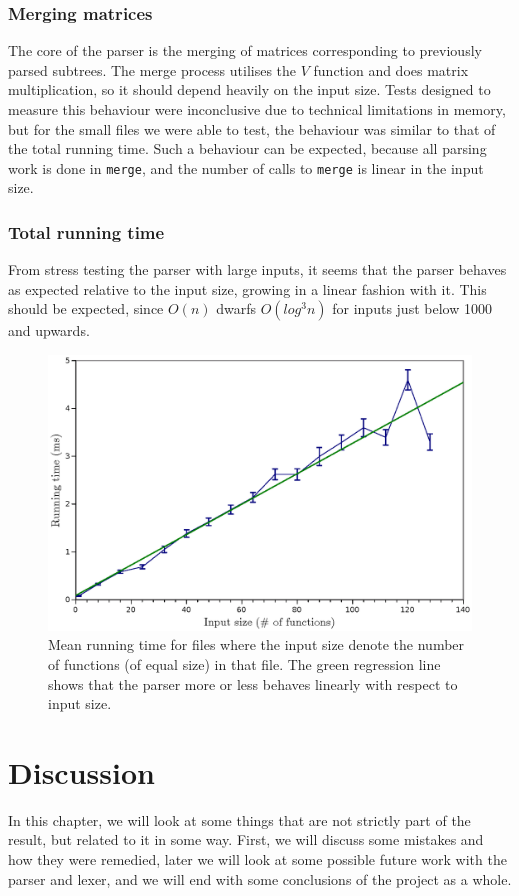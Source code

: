 \documentclass[a4paper,12pt,notitlepage]{report}
\begin{document}
\subsection{Merging matrices}
The core of the parser is the merging of matrices corresponding to previously
parsed subtrees. The merge process utilises the $V$ function and does matrix 
multiplication, so it should depend heavily on the input size. Tests designed to
measure this behaviour were inconclusive due to technical limitations in memory,
but for the small files we were able to test, the behaviour was similar to that
of the total running time. Such a behaviour can be expected, because all parsing
work is done in \texttt{merge}, and the number of calls to \texttt{merge} is
linear in the input size. 

\subsection{Total running time}
From stress testing the parser with large inputs, it seems that the parser
behaves as expected relative to the input size, growing in a linear fashion with
it. This should be expected, since $O(n)$ dwarfs $O(log^3 n)$ for inputs just
below 1000 and upwards.

\begin{figure}[H]
\includegraphics[width=\textwidth]{criterion-1-128.eps}
\caption{\label{criterion}Mean running time for files where the input size denote the
number of functions (of equal size) in that file. The green regression line
shows that the parser more or less behaves linearly with respect to input size.}
\end{figure}

%
%
\chapter{Discussion}
In this chapter, we will look at some things that are not strictly part of the
result, but related to it in some way. First, we will discuss some mistakes and
how they were remedied, later we will look at some possible future work with the
parser and lexer, and we will end with some conclusions of the project as a
whole.
\end{document}
